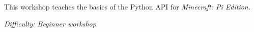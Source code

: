 %
%
%

\newif\ifprint
\printtrue



\newcommand{\workshopTitle}{Workshop 17: \textit{Minecraft: Pi Edition}}

\newcommand{\workshopAuthor}{Jack Kelly}



	
	
	This workshop teaches the basics of the Python API for \textit{Minecraft: Pi Edition}.
	
	\textit{Difficulty: Beginner workshop}

	\ifprint
		\renewcommand{\baselinestretch}{0.75}\normalsize
		\tableofcontents
		\renewcommand{\baselinestretch}{1.0}\normalsize
	\else
		\tableofcontents
	\fi
	
	
	
		\clearpage
		
	
		\webclearpage
		
	
		\webclearpage
	
	
	\webclearpage
		
